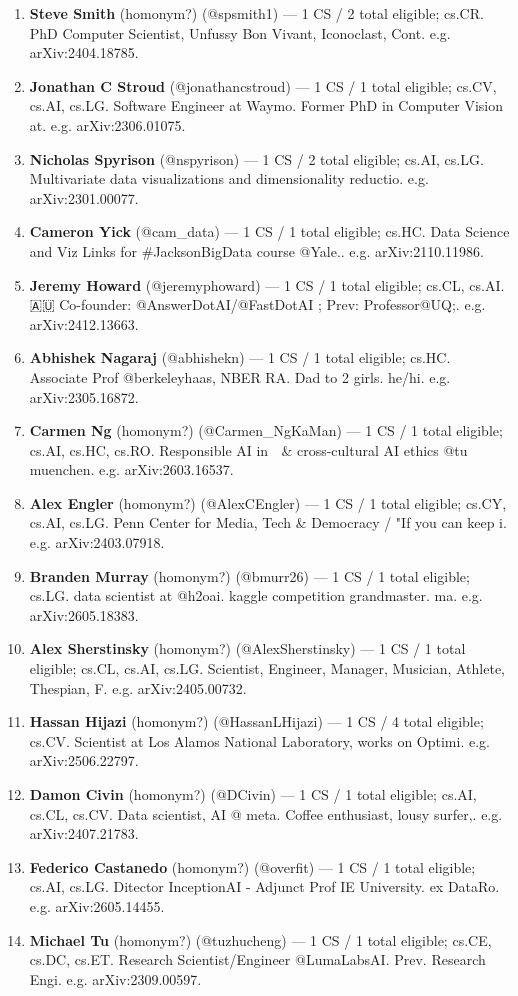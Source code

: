 \documentclass[twocolumn,10pt,letterpaper]{article}
\begin{document}
\begin{enumerate}
  \item \textbf{Steve Smith} (homonym?) (@spsmith1) — 1 CS / 2 total eligible; cs.CR. PhD Computer Scientist, Unfussy Bon Vivant, Iconoclast, Cont. e.g. arXiv:2404.18785.
  \item \textbf{Jonathan C Stroud} (@jonathancstroud) — 1 CS / 1 total eligible; cs.CV, cs.AI, cs.LG. Software Engineer at Waymo. Former PhD in Computer Vision at. e.g. arXiv:2306.01075.
  \item \textbf{Nicholas Spyrison} (@nspyrison) — 1 CS / 2 total eligible; cs.AI, cs.LG. Multivariate data visualizations and dimensionality reductio. e.g. arXiv:2301.00077.
  \item \textbf{Cameron Yick} (@cam\_data) — 1 CS / 1 total eligible; cs.HC. Data Science and Viz Links for \#JacksonBigData course @Yale.. e.g. arXiv:2110.11986.
  \item \textbf{Jeremy Howard} (@jeremyphoward) — 1 CS / 1 total eligible; cs.CL, cs.AI. 🇦🇺 Co-founder: @AnswerDotAI/@FastDotAI ; Prev: Professor@UQ;. e.g. arXiv:2412.13663.
  \item \textbf{Abhishek Nagaraj} (@abhishekn) — 1 CS / 1 total eligible; cs.HC. Associate Prof @berkeleyhaas, NBER RA. Dad to 2 girls. he/hi. e.g. arXiv:2305.16872.
  \item \textbf{Carmen Ng} (homonym?) (@Carmen\_NgKaMan) — 1 CS / 1 total eligible; cs.AI, cs.HC, cs.RO. Responsible AI in 🤖 \& cross-cultural AI ethics @tu muenchen. e.g. arXiv:2603.16537.
  \item \textbf{Alex Engler} (homonym?) (@AlexCEngler) — 1 CS / 1 total eligible; cs.CY, cs.AI, cs.LG. Penn Center for Media, Tech \& Democracy / "If you can keep i. e.g. arXiv:2403.07918.
  \item \textbf{Branden Murray} (homonym?) (@bmurr26) — 1 CS / 1 total eligible; cs.LG. data scientist at @h2oai. kaggle competition grandmaster. ma. e.g. arXiv:2605.18383.
  \item \textbf{Alex Sherstinsky} (homonym?) (@AlexSherstinsky) — 1 CS / 1 total eligible; cs.CL, cs.AI, cs.LG. Scientist, Engineer, Manager, Musician, Athlete, Thespian, F. e.g. arXiv:2405.00732.
  \item \textbf{Hassan Hijazi} (homonym?) (@HassanLHijazi) — 1 CS / 4 total eligible; cs.CV. Scientist at Los Alamos National Laboratory, works on Optimi. e.g. arXiv:2506.22797.
  \item \textbf{Damon Civin} (homonym?) (@DCivin) — 1 CS / 1 total eligible; cs.AI, cs.CL, cs.CV. Data scientist, AI @ meta. Coffee enthusiast, lousy surfer,. e.g. arXiv:2407.21783.
  \item \textbf{Federico Castanedo} (homonym?) (@overfit) — 1 CS / 1 total eligible; cs.AI, cs.LG. Ditector InceptionAI - Adjunct Prof IE University. ex DataRo. e.g. arXiv:2605.14455.
  \item \textbf{Michael Tu} (homonym?) (@tuzhucheng) — 1 CS / 1 total eligible; cs.CE, cs.DC, cs.ET. Research Scientist/Engineer @LumaLabsAI. Prev. Research Engi. e.g. arXiv:2309.00597.
\end{enumerate}


\balance
\end{document}
